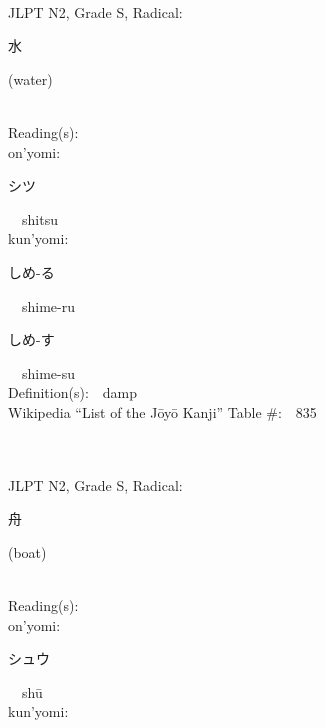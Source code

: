 \begin{multicols}{2}
{\fontsize{34pt}{40pt}  }\ \ \\  %
{JLPT N2, Grade S, Radical:\ \ {\begin{CJK}{UTF8}{min} 水 \end{CJK}} (water) } \\
Reading(s):\ \ \\
{\hspace*{1em}}on'yomi:\ \ \\
{\hspace*{2em}}{\begin{CJK}{UTF8}{min} シツ \end{CJK}}\ \ shitsu\ \ \\
{\hspace*{1em}}kun'yomi:\ \ \\
{\hspace*{2em}}{\begin{CJK}{UTF8}{min} しめ-る \end{CJK}}\ \ shime-ru\ \ \\
{\hspace*{2em}}{\begin{CJK}{UTF8}{min} しめ-す \end{CJK}}\ \ shime-su\ \ \\
Definition(s):\ \ damp \\
Wikipedia ``List of the J\=oy\=o Kanji'' Table \#:\ \ 835 \\
\ \ \\
{\fontsize{34pt}{40pt}  }\ \ \\  %
{JLPT N2, Grade S, Radical:\ \ {\begin{CJK}{UTF8}{min} 舟 \end{CJK}} (boat) } \\
Reading(s):\ \ \\
{\hspace*{1em}}on'yomi:\ \ \\
{\hspace*{2em}}{\begin{CJK}{UTF8}{min} シュウ \end{CJK}}\ \ sh\=u\ \ \\
{\hspace*{1em}}kun'yomi:\ \ \\

\end{multicols}
